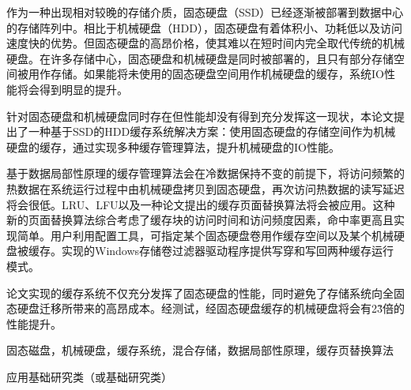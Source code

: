 
\begin{cabstract}

作为一种出现相对较晚的存储介质，固态硬盘（SSD）已经逐渐被部署到数据中心的存储阵列中。相比于机械硬盘（HDD），固态硬盘有着体积小、功耗低以及访问速度快的优势。但固态硬盘的高昂价格，使其难以在短时间内完全取代传统的机械硬盘。在许多存储中心，固态硬盘和机械硬盘是同时被部署的，且只有部分存储空间被用作存储。如果能将未使用的固态硬盘空间用作机械硬盘的缓存，系统IO性能将会得到明显的提升。

针对固态硬盘和机械硬盘同时存在但性能却没有得到充分发挥这一现状，本论文提出了一种基于SSD的HDD缓存系统解决方案：使用固态硬盘的存储空间作为机械硬盘的缓存，通过实现多种缓存管理算法，提升机械硬盘的IO性能。

基于数据局部性原理的缓存管理算法会在冷数据保持不变的前提下，将访问频繁的热数据在系统运行过程中由机械硬盘拷贝到固态硬盘，再次访问热数据的读写延迟将会很低。LRU、LFU以及一种论文提出的缓存页面替换算法将会被应用。这种新的页面替换算法综合考虑了缓存块的访问时间和访问频度因素，命中率更高且实现简单。用户利用配置工具，可指定某个固态硬盘卷用作缓存空间以及某个机械硬盘被缓存。实现的Windows存储卷过滤器驱动程序提供写穿和写回两种缓存运行模式。

论文实现的缓存系统不仅充分发挥了固态硬盘的性能，同时避免了存储系统向全固态硬盘迁移所带来的高昂成本。经测试，经固态硬盘缓存的机械硬盘将会有2\~3倍的性能提升。

\end{cabstract}

\begin{ckeywords}
固态磁盘，机械硬盘，缓存系统，混合存储，数据局部性原理，缓存页替换算法
\end{ckeywords}

\begin{cthesistype}
应用基础研究类（或基础研究类）
\end{cthesistype}


